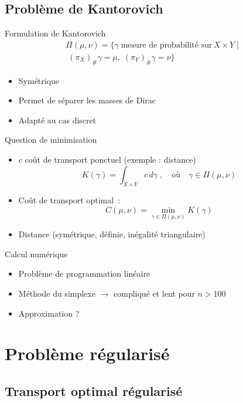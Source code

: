 \documentclass{beamer}
\begin{document}
\subsection{Problème de Kantorovich}

\begin{frame}{Formulation de Kantorovich}
\[
\begin{split}
\Pi(\mu,\nu) = \{\gamma\;\text{mesure de probabilité sur}\,X\times Y\;| \\
\;(\pi_X)_\# \gamma = \mu,\; (\pi_Y)_\# \gamma = \nu\}
\end{split}
\]
	\begin{itemize}
	\item Symétrique
	\item Permet de séparer les masses de Dirac
	\item Adapté au cas discret
	\end{itemize}
\end{frame}

\begin{frame}{Question de minimisation}
\begin{itemize}
\item $c$ coût de transport ponctuel (exemple : distance)
\[
K(\gamma) = \int_{X\times Y} c\,d\gamma \; ,\quad \text{où} \quad \gamma \in \Pi(\mu,\nu)
\]
\pause
\item Coût de transport optimal~:
\[C(\mu,\nu) = \min_{\gamma \in \Pi(\mu,\nu)} K(\gamma) \]
\pause
\item Distance (symétrique, définie, inégalité triangulaire)
\end{itemize}
\end{frame}

\begin{frame}{Calcul numérique}
\begin{itemize}
	\item Problème de programmation linéaire
	\item Méthode du simplexe $\rightarrow$ compliqué et lent pour $n>100$
	\item Approximation ?
\end{itemize}
\end{frame}



\section{Problème régularisé}

\subsection{Transport optimal régularisé}
\end{document}
